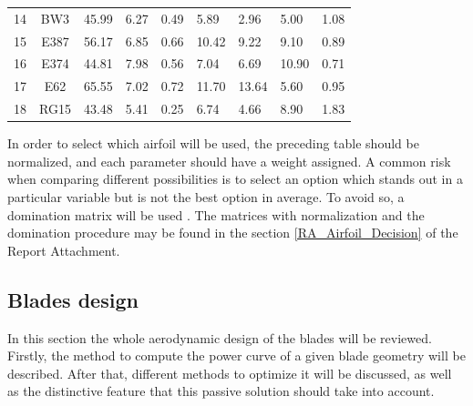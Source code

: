 \documentclass[../TFG_Report.tex]{subfiles}
\begin{document}
\begin{table}[]
\begin{tabular}{cc|C{1.5cm}|C{1.5cm}|C{1.75cm}|C{1.5cm}|C{1.5cm}|C{1.5cm}|C{1.3cm}}
		14         & BW3     & 45.99 & 6.27    & 0.49                         & 5.89   & 2.96  & 5.00      & 1.08  \\
		15         & E387    & 56.17 & 6.85    & 0.66                         & 10.42  & 9.22  & 9.10      & 0.89  \\
		16         & E374    & 44.81 & 7.98    & 0.56                         & 7.04   & 6.69  & 10.90     & 0.71  \\
		17         & E62     & 65.55 & 7.02    & 0.72                         & 11.70  & 13.64 & 5.60      & 0.95  \\
		18         & RG15    & 43.48 & 5.41    & 0.25                         & 6.74   & 4.66  & 8.90      & 1.83 
	\end{tabular}

\end{table}

In order to select which airfoil will be used, the preceding table should be normalized, and each parameter should have a weight assigned. A common risk when comparing different possibilities is to select an option which stands out in a particular variable but is not the best option in average. To avoid so, a domination matrix will be used \cite{ApuntsDomMatrix}. The matrices with normalization and the domination procedure may be found in the section \ref{RA_Airfoil_Decision} of the Report Attachment.





\subsection{Blades design}


In this section the whole aerodynamic design of the blades will be reviewed. Firstly, the method to compute the power curve of a given blade geometry will be described. After that, different methods to optimize it will be discussed, as well as the distinctive feature that this passive solution should take into account. 

\end{document}
